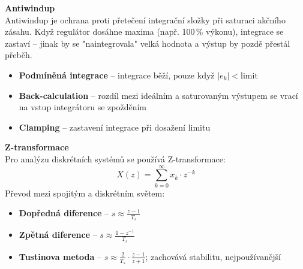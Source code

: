 \documentclass[a4paper,10pt]{article}
\begin{document}
\begin{vysvetlenibox}
\textbf{Antiwindup}\\
Antiwindup je ochrana proti přetečení integrační složky při saturaci
akčního zásahu. Když regulátor dosáhne maxima (např. 100\,\% výkonu),
integrace se zastaví -- jinak by se "naintegrovala" velká hodnota
a výstup by pozdě přestál přeběh.

\begin{itemize}[noitemsep, leftmargin=1.4em, topsep=4pt]
    \item \textbf{Podmíněná integrace} -- integrace běží, pouze když $|e_k| < \text{limit}$
    \item \textbf{Back-calculation} -- rozdíl mezi ideálním a saturovaným výstupem
          se vrací na vstup integrátoru se zpožděním
    \item \textbf{Clamping} -- zastavení integrace při dosažení limitu
\end{itemize}

\textbf{Z-transformace}\\
Pro analýzu diskrétních systémů se používá Z-transformace:
$$X(z) = \sum_{k=0}^{\infty} x_k \cdot z^{-k}$$
Převod mezi spojitým a diskrétním světem:
\begin{itemize}[noitemsep, leftmargin=1.4em, topsep=4pt]
    \item \textbf{Dopředná diference} -- $s \approx \frac{z-1}{T_s}$
    \item \textbf{Zpětná diference} -- $s \approx \frac{1-z^{-1}}{T_s}$
    \item \textbf{Tustinova metoda} -- $s \approx \frac{2}{T_s} \cdot \frac{z-1}{z+1}$;
          zachovává stabilitu, nejpoužívanější
\end{itemize}
\end{vysvetlenibox}


\end{document}
